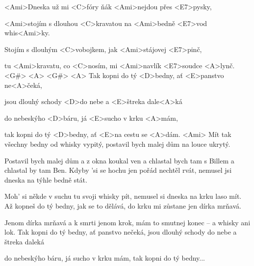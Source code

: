 
\zs
<Ami>Dneska už mi <C>fóry ňák <Ami>nejdou přes <E7>pysky,

<Ami>stojím s dlouhou <C>kravatou na <Ami>bedně <E7>vod whis<Ami>ky.

Stojím s dlouhým <C>vobojkem, jak <Ami>stájovej <E7>pinč,

tu <Ami>kravatu, co <C>nosím, mi <Ami>navlík <E7>soudce <A>lynč. <G#> <A> <G#> <A>
\ks
\zr
Tak kopni do tý <D>bedny, ať <E>panstvo ne<A>čeká,

jsou dlouhý schody <D>do nebe a <E>štreka dale<A>ká

do nebeskýho <D>báru, já <E>sucho v krku <A>mám,

tak kopni do tý <D>bedny, ať <E>na cestu se <A>dám. <Ami>
\kr
\zs
Mít tak všechny bedny od whisky vypitý,
postavil bych malej dům na louce ukrytý.

Postavil bych malej dům a z okna koukal ven
a chlastal bych tam s Billem a chlastal by tam Ben.
\ks
\zr \kr
\zs
Kdyby 'si se hochu jen pořád nechtěl rvát,
nemusel jsi dneska na týhle bedně stát.

Moh' si někde v suchu tu svoji whisky pít,
nemusel si dneska na krku laso mít.
\ks
\zr \kr
\zs
Až kopneš do tý bedny, jak se to dělává,
do krku mi zůstane jen dírka mrňavá.

Jenom dírka mrňavá a k smrti jenom krok,
mám to smutnej konec -- a whisky ani lok.
\ks
\zr
Tak kopni do tý bedny, ať panstvo nečeká,
jsou dlouhý schody do nebe a štreka daleká

do nebeskýho báru, já sucho v krku mám,
tak kopni do tý bedny...
\kr

\kp
